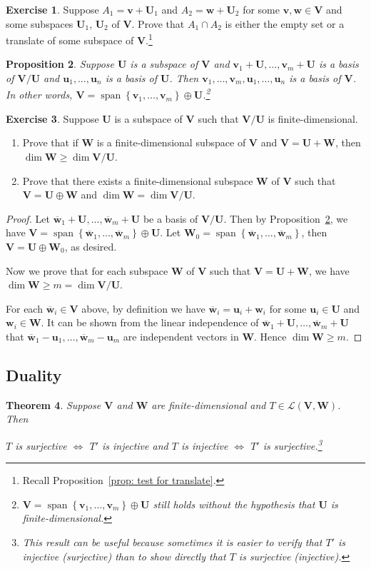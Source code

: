 \documentclass{tufte-handout}
\def \v {\vspace{0.2cm}}
\theoremstyle{plain} %
\newtheorem{thm}{Theorem}
\newtheorem{prop}[thm]{Proposition}
\theoremstyle{definition}
\newtheorem{exer}[thm]{Exercise}
\theoremstyle{remark}
\newcommand{\bra}[1]{\mathopen{}\left(#1\right)}
\newcommand{\cbra}[1]{\mathopen{}\left\{#1\right\}}
\newcommand{\mL}{\mathcal{L}}
\newcommand{\U}{\bm{U}}
\newcommand{\V}{\bm{V}}
\newcommand{\W}{\bm{W}}
\renewcommand{\u}{\bm{u}}
\renewcommand{\v}{\bm{v}}
\newcommand{\w}{\bm{w}}
\DeclareMathOperator{\spn}{span}
\begin{document}
\begin{exer}
	Suppose $A_1=\v+\U_1$ and $A_2=\w+\U_2$ for some $\v,\w\in\V$ and some subspaces $\U_1$, $\U_2$ of $\V$. Prove that $A_1\cap A_2$ is either the empty set or a translate of some subspace of $\V$.\footnote{Recall Proposition~\ref{prop: test for translate}.}
\end{exer}

\begin{prop}\label{prop: direct sum from quotient space}
	Suppose $\U$ is a subspace of $\V$ and $\v_1+\U,\dots,\v_m+\U$ is a basis of $\V/\U$ and $\u_1,\dots,\u_n$ is a basis of $\U$. Then $\v_1,\dots,\v_m,\u_1,\dots,\u_n$ is a basis of $\V$. In other words, $\V=\spn\cbra{\v_1,\dots,\v_m}\oplus\U$.\footnote{$\V=\spn\cbra{\v_1,\dots,\v_m}\oplus\U$ still holds without the hypothesis that $\U$ is finite-dimensional.}
\end{prop}

\begin{exer}
	Suppose $\U$ is a subspace of $\V$ such that $\V/\U$ is finite-dimensional.
	\begin{enumerate}
		\item Prove that if $\W$ is a finite-dimensional subspace of $\V$ and $\V=\U+\W$, then $\dim\W\geq\dim\V/\U$.
		\item Prove that there exists a finite-dimensional subspace $\W$ of $\V$ such that $\V=\U\oplus\W$ and $\dim\W=\dim\V/\U$.
	\end{enumerate}
\end{exer}
\begin{proof}
	Let $\overline{\w}_1+\U,\dots,\overline{\w}_m+\U$ be a basis of $\V/\U$. Then by Proposition~\ref{prop: direct sum from quotient space}, we have $\V=\spn\cbra{\overline{\w}_1,\dots,\overline{\w}_m}\oplus\U$. Let $\W_0=\spn\cbra{\overline{\w}_1,\dots,\overline{\w}_m}$, then $\V=\U\oplus\W_0$, as desired.

	Now we prove that for each subspace $\W$ of $\V$ such that $\V=\U+\W$, we have $\dim\W\geq m=\dim\V/\U$.
	
	For each $\overline{\w}_i\in\V$ above, by definition we have $\overline{\w}_i=\u_i+\w_i$ for some $\u_i\in\U$ and $\w_i\in\W$. It can be shown from the linear independence of $\overline{\w}_1+\U,\dots,\overline{\w}_m+\U$ that $\overline{\w}_1-\u_1,\dots,\overline{\w}_m-\u_m$ are independent vectors in $\W$. Hence $\dim\W\geq m$.
\end{proof}


\subsection{Duality}
\begin{thm}
	Suppose $\V$ and $\W$ are finite-dimensional and $T\in\mL\bra{\V,\W}$. Then
	\begin{center}
	$T$ is surjective $\iff$ $T'$ is injective \quad and \quad $T$ is injective $\iff$ $T'$ is surjective.\footnote{This result can be useful because sometimes it is easier to verify that $T'$ is injective (surjective) than to show directly that $T$ is surjective (injective).}
	\end{center}
\end{thm}
\end{document}
